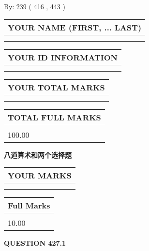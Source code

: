 \documentclass{ctexart}
\begin{document}
   
\hspace{1.0in} By: 
 239 ( 416 ,  443 )
   
   
   
   
\newpage 
\setcounter{page}{ 
   427001 } 
   
   
   
   
\noindent\begin{tabular}{|l|}
\hline
YOUR NAME (FIRST, ... LAST)  \\
\hline
 \\ 
 \\ 
\hline
\end{tabular}
\hspace{0.05in} \begin{tabular}{|l|}
\hline
 YOUR   ID   INFORMATION  \\
\hline
 \\ 
 \\ 
\hline
\end{tabular}
   
   
\vspace{0.2in}\noindent\begin{tabular}{|l|}
\hline
YOUR TOTAL MARKS  \\
\hline
 \\ 
 \\ 
\hline
\end{tabular}
\hspace{0.05in} \begin{tabular}{|l|}
\hline
TOTAL FULL MARKS  \\
\hline
 \\ 
100.00 \\
\hline
\end{tabular}
   
   
 \vspace{0.2in}
{\LARGE {\textbf{ 八道算术和两个选择题}}}
   
   
  
\vspace{0.2in}
  
\noindent\begin{tabular}{|l|}
\hline
 YOUR MARKS  \\
\hline
 \\ 
 \\ 
\hline
\end{tabular}
\hspace{0.05in} \begin{tabular}{|l|}
\hline
 Full Marks  \\
\hline
 \\ 
10.00 \\
\hline
\end{tabular}
{\textbf{\Large{QUESTION
427.1 
}}}
  
\end{document}
